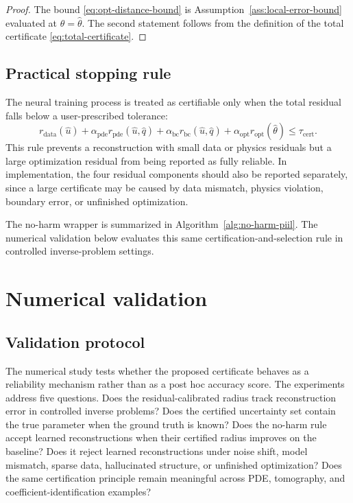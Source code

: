 \documentclass{article}
\numberwithin{equation}{section}
\theoremstyle{definition}
\begin{document}
\begin{proof}
The bound \eqref{eq:opt-distance-bound} is Assumption~\ref{ass:local-error-bound} evaluated at \(\theta=\widehat\theta\). The second statement follows from the definition of the total certificate \eqref{eq:total-certificate}.
\end{proof}

\subsection{Practical stopping rule}

The neural training process is treated as certifiable only when the total residual falls below a user-prescribed tolerance:
\begin{equation}
r_{\mathrm{data}}(\widehat u)
+
\alpha_{\mathrm{pde}} r_{\mathrm{pde}}(\widehat u,\widehat q)
+
\alpha_{\mathrm{bc}} r_{\mathrm{bc}}(\widehat u,\widehat q)
+
\alpha_{\mathrm{opt}} r_{\mathrm{opt}}(\widehat\theta)
\le
\tau_{\mathrm{cert}} .
\label{eq:stopping-rule}
\end{equation}
This rule prevents a reconstruction with small data or physics residuals but a large optimization residual from being reported as fully reliable. In implementation, the four residual components should also be reported separately, since a large certificate may be caused by data mismatch, physics violation, boundary error, or unfinished optimization.

The no-harm wrapper is summarized in Algorithm~\ref{alg:no-harm-piil}. The numerical validation below evaluates this same certification-and-selection rule in controlled inverse-problem settings.

\section{Numerical validation}
\label{sec:numerical-validation}

\subsection{Validation protocol}
\label{subsec:validation-protocol}

The numerical study tests whether the proposed certificate behaves as a reliability mechanism rather than as a post hoc accuracy score. The experiments address five questions. Does the residual-calibrated radius track reconstruction error in controlled inverse problems? Does the certified uncertainty set contain the true parameter when the ground truth is known? Does the no-harm rule accept learned reconstructions when their certified radius improves on the baseline? Does it reject learned reconstructions under noise shift, model mismatch, sparse data, hallucinated structure, or unfinished optimization? Does the same certification principle remain meaningful across PDE, tomography, and coefficient-identification examples?
\end{document}
